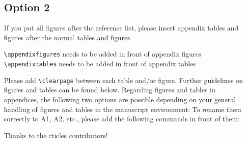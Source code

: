 \documentclass[gc, manuscript]{copernicus}
\begin{document}
\subsection{Option 2}

If you put all figures after the reference list, please insert appendix
tables and figures after the normal tables and figures.

\texttt{\textbackslash{}appendixfigures} needs to be added in front of
appendix figures \texttt{\textbackslash{}appendixtables} needs to be
added in front of appendix tables

Please add \texttt{\textbackslash{}clearpage} between each table and/or
figure. Further guidelines on figures and tables can be found below.
Regarding figures and tables in appendices, the following two options
are possible depending on your general handling of figures and tables in
the manuscript environment: To rename them correctly to A1, A2, etc.,
please add the following commands in front of them:
\noappendix




\begin{acknowledgements}
Thanks to the rticles contributors!
\end{acknowledgements}







\end{document}
